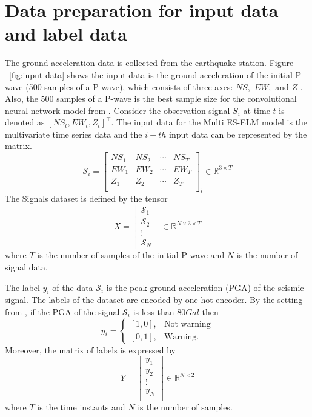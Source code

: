 \section{Data preparation for input data and label data}\label{sec:data}
The ground acceleration data is collected from the earthquake station. Figure ~\ref{fig:input-data} shows the input data is the ground acceleration of the initial P-wave (500 samples of a P-wave), which consists of three axes: $NS,$ $EW,$ and $Z$ \cite{chiang2022neural, jozinovic2020rapid}. Also, the 500 samples of a P-wave is the best sample size for the convolutional neural network model from \cite{chiang2022neural}. Consider the observation signal $S_i$ at time $t$ is denoted as $[NS_t, EW_t, Z_t]^\top$. The input data for the Multi ES-ELM model is the multivariate time series data and the $i-th$ input data can be represented by the matrix.
\begin{equation*}
    \mathcal{S}_i 
=
\begin{bmatrix}
NS_{1} & NS_{2} & \cdots & NS_{T}\\
EW_{1} & EW_{2} & \cdots & EW_{T}\\
Z_{1} & Z_{2} & \cdots & Z_{T}\\
\end{bmatrix}_i\in \mathbb{R}^{3\times T}
\end{equation*}
The Signals dataset is defined by the tensor
\begin{equation*}
 X = 
\begin{bmatrix}
\mathcal{S}_{1}\\
\mathcal{S}_{2}\\
\vdots\\
\mathcal{S}_N
\end{bmatrix} \in \mathbb{R}^{N\times 3\times T}
\end{equation*}
where $T$ is the number of samples of the initial P-wave and $N$ is the number of signal data.    

The label $y_i$ of the data $\mathcal{S}_i$ is the peak ground acceleration (PGA) of the seismic signal. The labels of the dataset are encoded by one hot encoder. By the setting from \cite{chiang2022neural}, if the PGA of the signal $\mathcal{S}_i$ is less than $80Gal$ then 
$$y_i = \begin{cases}
    [1, 0], & \text{Not warning}\\
    [0, 1], & \text{Warning}.
\end{cases}$$
Moreover, the matrix of labels is expressed by
\begin{equation*}
Y = 
\begin{bmatrix}
y_1\\
y_2\\
\vdots\\
y_N\\
\end{bmatrix}\in\mathbb{R}^{N\times 2}
\end{equation*}
where $T$ is the time instants and $N$ is the number of samples.\\ 

